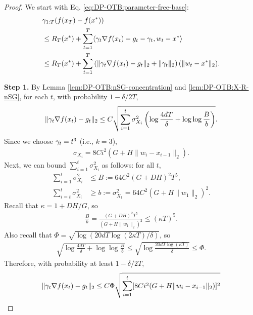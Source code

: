 \ThmDpotbPFA*

\begin{proof}
We start with Eq. \eqref{eq:DP-OTB:parameter-free-base}:
\begin{align}
    &\gamma_{1:T}(f(x_T)-f(x^*)) \\
    &\leq R_T(x^*) + \sum_{t=1}^T\langle \gamma_t\nabla f(x_t)-g_t-\gamma_t,w_t-x^*\rangle \notag\\
    &\leq R_T(x^*) + \sum_{t=1}^T \left(\|\gamma_t\nabla f(x_t)-g_t\|_2+\|\gamma_t\|_2\right) (\|w_t-x^*\|_2). \label{eq:DP-OTB:parameter-free-base}
\end{align}

\textbf{Step 1.}
By Lemma \ref{lem:DP-OTB:nSG-concentration} and \ref{lem:DP-OTB:X-R-nSG}, for each $t$, with probability $1-\delta/2T$,
\begin{align*}
    \|\gamma_t\nabla f(x_t)-g_t\|_2 
    \leq C\sqrt{\sum_{i=1}^t \sigma_{X_i}^2 \left( \log\frac{4dT}{\delta} + \log\log\frac{B}{b}\right)}.
\end{align*}
Since we choose $\gamma_t=t^3$ (i.e., $k=3$),
\begin{align*}
    \sigma_{X_i} = 8Ci^2(G+H\|w_i-x_{i-1}\|_2).
\end{align*}
Next, we can bound $\sum_{i=1}^t\sigma_{X_i}^2$ as follows: for all $t$,
\begin{align*}
    \textstyle \sum_{i=1}^t \sigma_{X_i}^2 &\leq B := 64C^2(G+DH)^2T^5, \\
    \textstyle \sum_{i=t}^t \sigma_{X_i}^2 &\geq b := \sigma_{X_1}^2 = 64C^2(G+H\|w_1\|_2)^2.
\end{align*}
Recall that $\kappa = 1+DH/G$, so
\begin{align*}
    \frac{B}{b} = \frac{(G+DH)^2T^5}{(G+H\|w_1\|_2)^2} \leq (\kappa T)^5.
\end{align*}
Also recall that $\Phi=\sqrt{\log(20dT\log(2\kappa T)/\delta)}$, so
\begin{align*}
    \sqrt{\log\frac{4dT}{\delta} + \log\log \frac{B}{b}} \leq \sqrt{\log \frac{20dT\log(\kappa T)}{\delta}} \leq \Phi.
\end{align*}
Therefore, with probability at least $1-\delta/2T$,
\begin{align}
    \|\weight_t \nabla f(x_t) - g_t\|_2 
    &\leq C\Phi \sqrt{\sum_{i=1}^t [8Ci^2(G+H\|w_i-x_{i-1}\|_2)]^2} \notag\\

\end{align}
\end{proof}
